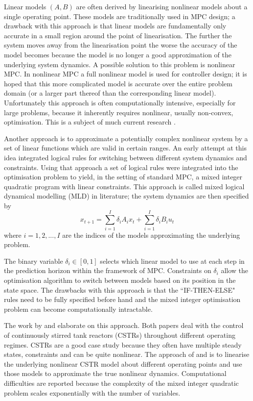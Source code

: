 Linear models $(A, B)$ are often derived by linearising nonlinear models about a single operating point. These models are traditionally used in MPC design; a drawback with this approach is that linear models are fundamentally only accurate in a small region around the point of linearisation. The further the system moves away from the linearisation point the worse the accuracy of the model becomes because the model is no longer a good approximation of the underlying system dynamics. A possible solution to this problem is nonlinear MPC. In nonlinear MPC a full nonlinear model is used for controller design; it is hoped that this more complicated model is accurate over the entire problem domain (or a larger part thereof than the corresponding linear model). Unfortunately this approach is often computationally intensive, especially for large problems, because it inherently requires nonlinear, usually non-convex, optimisation. This is a subject of much current research \cite{diehl}. 

Another approach is to approximate a potentially complex nonlinear system by a set of linear functions which are valid in certain ranges. An early attempt at this idea \cite{bemporad} integrated logical rules for switching between different system dynamics and constraints. Using that approach a set of logical rules were integrated into the optimisation problem to yield, in the setting of standard MPC, a mixed integer quadratic program with linear constraints. This approach is called mixed logical dynamical modelling (MLD) in literature; the system dynamics are then specified by
\begin{equation}
x_{t+1} = \sum_{i=1}^I \delta_i A_i x_t + \sum_{i=1}^I \delta_i B_i u_t
\label{eq_mld_system}
\end{equation}
where $i=1,2,..., I$ are the indices of the models approximating the underlying problem.

The binary variable $\delta_i \in [0, 1]$ selects which linear model to use at each step in the prediction horizon within the framework of MPC. Constraints on $\delta_i$ allow the optimisation algorithm to switch between models based on its position in the state space.  The drawbacks with this approach is that the ``IF-THEN-ELSE" rules need to be fully specified before hand and the mixed integer optimisation problem can become computationally intractable. 

The work by \cite{du} and \cite{sakakura} elaborate on this approach. Both papers deal with the control of continuously stirred tank reactors (CSTRs) throughout different operating regimes. CSTRs are a good case study because they often have multiple steady states, constraints and can be quite nonlinear. The approach of \cite{du} and \cite{sakakura} is to linearise the underlying nonlinear CSTR model about different operating points and use those models to approximate the true nonlinear dynamics. Computational difficulties are reported because the complexity of the mixed integer quadratic problem scales exponentially with the number of variables.

